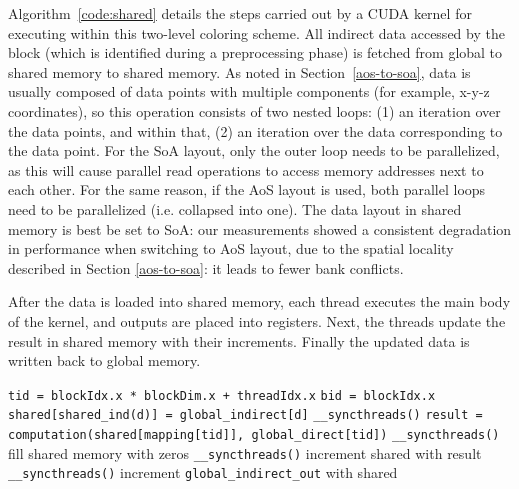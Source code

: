 Algorithm~\ref{code:shared} details the steps carried out by a CUDA kernel for
executing within this two-level coloring scheme. All indirect data accessed by
the block (which is identified during a preprocessing phase) is fetched from
global to shared memory to shared memory. As noted in Section~\ref{aos-to-soa},
data is usually composed of data points with multiple components (for example,
x-y-z coordinates), so this operation consists of two nested loops: (1) an
iteration over the data points, and within that, (2) an iteration over the data
corresponding to the data point. For the SoA layout, only the outer loop needs
to be parallelized, as this will cause parallel read operations to access memory
addresses next to each other. For the same reason, if the AoS layout is used,
both parallel loops need to be parallelized (i.e.  collapsed into one). The data
layout in shared memory is best be set to SoA: our measurements showed a
consistent degradation in performance when switching to AoS layout, due to the
spatial locality described in Section \ref{aos-to-soa}: it leads to fewer bank
conflicts.

After the data is loaded into shared memory, each thread executes the main body 
of the kernel, and outputs are placed into registers.  Next, the threads update 
the result in shared memory with their increments. Finally the updated data is 
written back to global memory.

\begin{algorithm}
  \begin{algorithmic}
    \State \lstinline!tid = blockIdx.x * blockDim.x + threadIdx.x!
    \State \lstinline!bid = blockIdx.x!
        \State \lstinline!shared[shared_ind(d)] = global_indirect[d]!
      \EndFor
    \EndFor
    \State \lstinline!__syncthreads()!
    \State \lstinline!result = computation(shared[mapping[tid]], global_direct[tid])!
    \State \lstinline!__syncthreads()!
    \State fill shared memory with zeros
    \State \lstinline!__syncthreads()!
        \State increment shared with result
      \EndIf
      \State \lstinline!__syncthreads()!
    \EndFor
        \State increment \lstinline!global_indirect_out! with shared
      \EndFor
    \EndFor
  \end{algorithmic}
  \caption{Algorithm to use the shared memory to preload indirect data accessed
  within a thread block. \lstinline!global_indirect! holds the data indirectly
  read, \lstinline!global_indirect_out! holds the result of the iteration.}
  \label{code:shared}
\end{algorithm}

